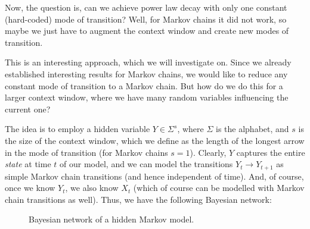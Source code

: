 \documentclass[../../main.tex]{subfiles}
\begin{document}
    Now, the question is, can we achieve power law decay with only one constant (hard-coded) mode of transition? Well, for Markov chains it did not work, so maybe we just have to augment the context window and create new modes of transition.

    This is an interesting approach, which we will investigate on. Since we already established interesting results for Markov chains, we would like to reduce any constant mode of transition to a Markov chain. But how do we do this for a larger context window, where we have many random variables influencing the current one?
    
    The idea is to employ a hidden variable $Y \in \Sigma ^s$, where $\Sigma$ is the alphabet, and $s$ is the size of the context window, which we define as the length of the longest arrow in the mode of transition (for Markov chains $s = 1$). Clearly, $Y$ captures the entire \emph{state} at time $t$ of our model, and we can model the transitions $Y_t \to Y_{t + 1}$ as simple Markov chain transitions (and hence independent of time). And, of course, once we know $Y_t$, we also know $X_t$ (which of course can be modelled with Markov chain transitions as well). Thus, we have the following Bayesian network:

    \begin{figure}[h]
        \center
        \caption{Bayesian network of a hidden Markov model.}
        \label{fig:bayesian_network_hidden_markov}
    \end{figure}
\end{document}
